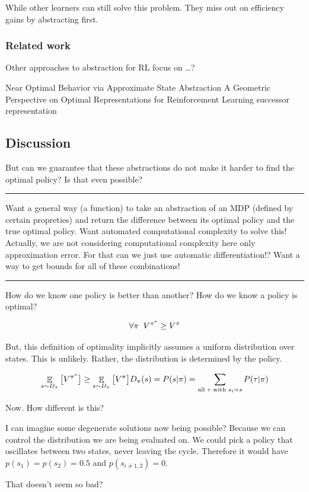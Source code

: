 While other learners can still solve this problem. They miss out on
efficiency gains by abstracting first.

\hypertarget{related-work}{%
\subsubsection{Related work}\label{related-work}}

Other approaches to abstraction for RL focus on \ldots{}?

Near Optimal Behavior via Approximate State Abstraction \cite{Abel2017}
A Geometric Perspective on Optimal Representations for Reinforcement Learning \cite{Bellemare2019b}
successor representation

\hypertarget{discussion}{%
\subsection{Discussion}\label{discussion}}

But can we guarantee that these abstractions do not make it harder to
find the optimal policy? Is that even possible?

\begin{center}\rule{0.5\linewidth}{\linethickness}\end{center}

Want a general way (a function) to take an abstraction of an MDP
(defined by certain propreties) and return the difference between its
optimal policy and the true optimal policy. Want automated computational
complexity to solve this! Actually, we are not considering computational
complexity here only approximation error. For that can we just use
automatic differentiation!? Want a way to get bounds for all of these
combinations!

\begin{center}\rule{0.5\linewidth}{\linethickness}\end{center}

How do we know one policy is better than another? How do we know a
policy is optimal?

\[
\forall \pi\;\; V^{\pi^* } \ge V^{\pi} \\
\]

But, this definition of optimality implicitly assumes a uniform
distribution over states. This is unlikely. Rather, the distribution is
determined by the policy.

\[
\mathop{{\mathbb E}}_{s\sim D_{\pi}} \big[ V^{\pi^* } \big] \ge \mathop{{\mathbb E}}_{s\sim D_{\pi}} \big[ V^{\pi} \big] \\
D_{\pi}(s) = P(s | \pi) = \sum_{\text{all } \tau \text{ with } s_t = s} P(\tau | \pi)
\]

Now. How different is this?

I can imagine some degenerate solutions now being possible? Because we
can control the distribution we are being evaluated on. We could pick a
policy that oscillates between two states, never leaving the cycle.
Therefore it would have \(p(s_1) = p(s_2) = 0.5\) and
\(p(s_{i \neq 1,2}) = 0\).

That doesn't seem so bad?
